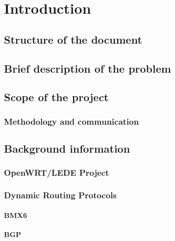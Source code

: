 \chapter{Introduction}
\label{ch:introduction}
\pagestyle{headings}



\section{Structure of the document}



\section{Brief description of the problem}
\label{sec:bdotp}


\section{Scope of the project}
\label{sec:sotp}



\subsection{Methodology and communication}


\section{Background information}
\label{sec:bi}

\subsection{OpenWRT/LEDE Project}



\subsection{Dynamic Routing Protocols}
\label{subsec:drp}


\subsubsection{BMX6}


\subsubsection{BGP}
\label{subsubsec:BADV}



